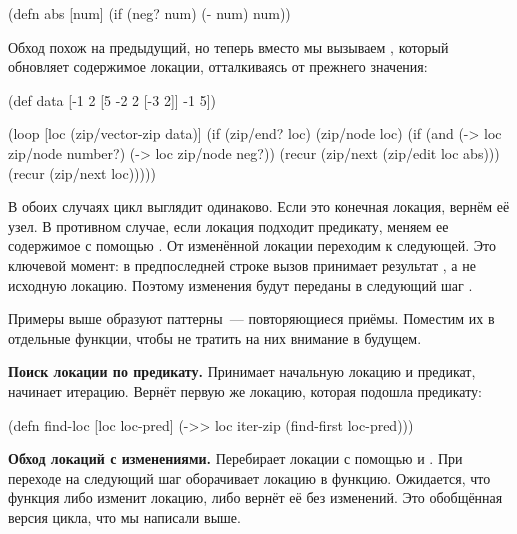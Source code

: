 \begin{english}
  \begin{clojure}
(defn abs [num]
  (if (neg? num)
    (- num)
    num))
  \end{clojure}
\end{english}

Обход похож на предыдущий, но теперь вместо  мы вызываем
, который обновляет содержимое локации, отталкиваясь от прежнего
значения:

\begin{english}
  \begin{clojure}
(def data [-1 2 [5 -2 2 [-3 2]] -1 5])

(loop [loc (zip/vector-zip data)]
  (if (zip/end? loc)
    (zip/node loc)
    (if (and (-> loc zip/node number?)
             (-> loc zip/node neg?))
      (recur (zip/next (zip/edit loc abs)))
      (recur (zip/next loc)))))
  \end{clojure}
\end{english}

В обоих случаях цикл выглядит одинаково. Если это конечная локация, вернём её
узел. В противном случае, если локация подходит предикату, меняем ее содержимое
с помощью . От изменённой локации переходим к следующей. Это ключевой
момент: в предпоследней строке вызов  принимает результат ,
а не исходную локацию. Поэтому изменения будут переданы в следующий шаг .

Примеры выше образуют паттерны~--- повторяющиеся приёмы. Поместим их в отдельные
функции, чтобы не тратить на них внимание в будущем.

\textbf{Поиск локации по предикату.} Принимает начальную локацию и предикат, начинает
итерацию. Вернёт первую же локацию, которая подошла предикату:

\begin{english}
  \begin{clojure}
(defn find-loc [loc loc-pred]
  (->> loc
       iter-zip
       (find-first loc-pred)))
  \end{clojure}
\end{english}

\textbf{Обход локаций с изменениями.} Перебирает локации с помощью  и
. При переходе на следующий шаг оборачивает локацию в
функцию. Ожидается, что функция либо изменит локацию, либо вернёт её без
изменений. Это обобщённая версия цикла, что мы написали выше.


